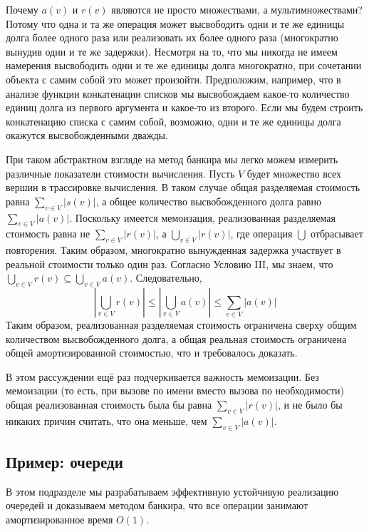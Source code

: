 Почему $a(v)$ и $r(v)$ являются не просто множествами, а
мультимножествами? Потому что одна и та же операция может высвободить
одни и те же единицы долга более одного раза или реализовать их более
одного раза (многократно вынудив одни и те же задержки). Несмотря на
то, что мы никогда не имеем намерения высвободить одни и те же единицы долга
многократно, при сочетании объекта с самим собой это может произойти.
Предположим, например, что в анализе функции конкатенации списков мы
высвобождаем какое-то количество единиц долга из первого аргумента и
какое-то из второго. Если мы будем строить конкатенацию списка с самим
собой, возможно, одни и те же единицы долга окажутся высвобожденными
дважды.

При таком абстрактном взгляде на метод банкира мы легко можем измерить
различные показатели стоимости вычисления. Пусть $V$ будет множество
всех вершин в трассировке вычисления. В таком случае общая разделяемая
стоимость равна $\sum_{v \in V}|s(v)|$, а общее количество
высвобожденного долга равно $\sum_{v \in V}|a(v)|$. Поскольку имеется
мемоизация, реализованная разделяемая стоимость равна не
$\sum_{v \in V}|r(v)|$, а $\bigcup_{v \in V}|r(v)|$, где операция $\bigcup$
отбрасывает повторения. Таким образом, многократно вынужденная
задержка участвует в реальной стоимости только один раз. Согласно
Условию III, мы знаем, что
$\bigcup_{v \in V}r(v) \subseteq \bigcup_{v \in V}
a(v)$. Следовательно,
$$
|\bigcup_{v \in V} r(v)| \le |\bigcup_{v \in V} a(v)| \le \sum_{v \in V} |a(v)|
$$
Таким образом, реализованная разделяемая стоимость ограничена сверху
общим количеством высвобожденного долга, а общая реальная стоимость
ограничена общей амортизированной стоимостью, что и требовалось
доказать.

\begin{remark}
  В этом рассуждении ещё раз подчеркивается важность мемоизации. Без
  мемоизации (то есть, при вызове по имени вместо вызова по
  необходимости) общая реализованная стоимость была бы равна
  $\sum_{v \in V} |r(v)|$, и не было бы никаких причин считать, что
  она меньше, чем $\sum_{v \in V} |a(v)|$.
\end{remark}

\subsection{Пример: очереди}
\label{sc:6.3.2}

В этом подразделе мы разрабатываем эффективную устойчивую реализацию
очередей и доказываем методом банкира, что все операции занимают амортизированное время
$O(1)$.

